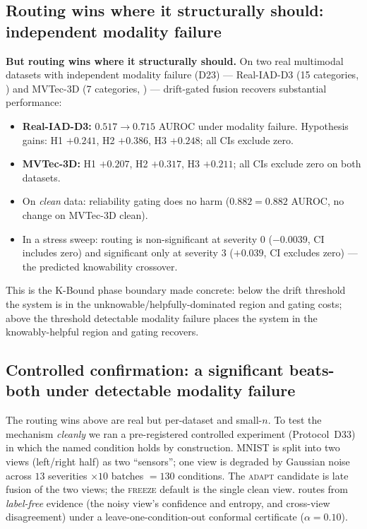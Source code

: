\subsection{Routing wins where it structurally should: independent modality failure}\label{sec:elara-routing-pos}

\textbf{But routing wins where it structurally should.}  On two real multimodal
datasets with independent modality failure (D23) --- Real-IAD-D3 (15 categories,
\cite{wang2024realiad}) and MVTec-3D (7 categories,
\cite{bergmann2022mvtec3d,bergmann2019mvtec}) --- drift-gated fusion recovers
substantial performance:

\begin{itemize}
\item \textbf{Real-IAD-D3:} $0.517 \to 0.715$ AUROC under modality failure.
  Hypothesis gains: H1 $+0.241$, H2 $+0.386$, H3 $+0.248$; all CIs exclude zero.
\item \textbf{MVTec-3D:} H1 $+0.207$, H2 $+0.317$, H3 $+0.211$; all CIs exclude
  zero on both datasets.
\item On \emph{clean} data: reliability gating does no harm ($0.882 = 0.882$ AUROC,
  no change on MVTec-3D clean).
\item In a stress sweep: routing is non-significant at severity 0 ($-0.0039$,
  CI includes zero) and significant only at severity 3 ($+0.039$, CI excludes
  zero) --- the predicted knowability crossover.
\end{itemize}

This is the K-Bound phase boundary made concrete: below the drift threshold the
system is in the unknowable/helpfully-dominated region and gating costs; above the
threshold detectable modality failure places the system in the knowably-helpful
region and gating recovers.

\subsection{Controlled confirmation: a significant beats-both under detectable modality failure}\label{sec:elara-controlled}

The routing wins above are real but per-dataset and small-$n$.  To test the mechanism
\emph{cleanly} we ran a pre-registered controlled experiment (Protocol~D33) in which the named
condition holds by construction.  MNIST is split into two views (left/right half) as two
``sensors''; one view is degraded by Gaussian noise across $13$ severities $\times 10$ batches
$=130$ conditions.  The \textsc{adapt} candidate is late fusion of the two views; the
\textsc{freeze} default is the single clean view.  \KGA{} routes from \emph{label-free} evidence (the
noisy view's confidence and entropy, and cross-view disagreement) under a leave-one-condition-out
conformal certificate ($\alpha=0.10$).

